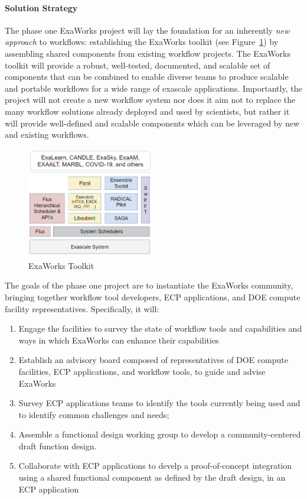 \paragraph{Solution Strategy}
The phase one ExaWorks project will lay the foundation for 
an inherently \textit{new approach} to workflows: establishing the ExaWorks toolkit 
(see Figure~\ref{fig:arch}) by assembling shared components from existing workflow projects. 
The ExaWorks toolkit will provide a robust, well-tested, documented, and scalable set of components 
that can be combined to enable diverse teams to produce scalable and portable workflows for a wide range of exascale applications.  
Importantly, the project will not create a new workflow system nor does
it aim not to replace the many workflow solutions already deployed and used by scientists, 
but rather it will provide well-defined and scalable components which can be leveraged by new and existing workflows.


\begin{figure}
\begin{center}
    \includegraphics[width=0.5\textwidth]{projects/2.3.5-Ecosystem/2.3.5.10-ExaWorks/exaworks.png}
  \end{center}
  \caption{ExaWorks Toolkit\label{fig:arch}}
\end{figure} 

The goals of the phase one project are to instantiate the ExaWorks community, 
bringing together workflow tool developers, ECP applications, and DOE compute facility representatives.  Specifically, it will:
\begin{enumerate}
    \item Engage the facilities to survey the state of workflow tools and capabilities and ways in which ExaWorks can enhance their capabilities
    \item Establish an advisory board composed of representatives of DOE compute facilities, ECP applications, and workflow tools, to guide and advise ExaWorks
    \item Survey ECP applications teams to identify the tools currently being used and to identify common challenges and needs;
    \item Assemble a functional design working group to develop a community-centered draft function design.
    \item Collaborate with ECP applications to develp a proof-of-concept integration using a shared functional component as defined by the draft design, in an ECP application
\end{enumerate}

